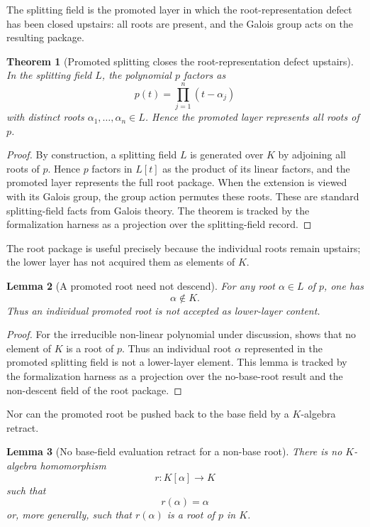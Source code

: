 \documentclass[11pt]{article}
\newtheorem{theorem}{Theorem}[section]
\newtheorem{lemma}[theorem]{Lemma}
\theoremstyle{definition}
\begin{document}
The splitting field is the promoted layer in which the root-representation defect
has been closed upstairs: all roots are present, and the Galois group acts on the
resulting package.

\begin{theorem}[Promoted splitting closes the root-representation defect upstairs]
\label{thm:gal-splitting-closes-upstairs}
In the splitting field \(L\), the polynomial \(p\) factors as
\[
p(t)=\prod_{j=1}^{n}(t-\alpha_j)
\]
with distinct roots \(\alpha_1,\ldots,\alpha_n\in L\).  Hence the promoted layer represents all roots of \(p\).
\end{theorem}

\begin{proof}
By construction, a splitting field \(L\) is generated over \(K\) by adjoining all
roots of \(p\).  Hence \(p\) factors in \(L[t]\) as the product of its linear
factors, and the promoted layer represents the full root package.  When the
extension is viewed with its Galois group, the group action permutes these roots.
These are standard splitting-field facts from Galois theory.  The theorem is
tracked by the formalization harness as a projection over the splitting-field
record.
\end{proof}

The root package is useful precisely because the individual roots remain
upstairs; the lower layer has not acquired them as elements of \(K\).

\begin{lemma}[A promoted root need not descend]
\label{lem:gal-root-not-descend}
For any root \(\alpha\in L\) of \(p\), one has
\[
\alpha\notin K.
\]
Thus an individual promoted root is not accepted as lower-layer content.
\end{lemma}

\begin{proof}
For the irreducible non-linear polynomial under discussion, 
shows that no element of \(K\) is a root of \(p\).  Thus an individual root
\(\alpha\) represented in the promoted splitting field is not a lower-layer
element.  This lemma is tracked by the formalization harness as a projection over
the no-base-root result and the non-descent field of the root package.
\end{proof}

Nor can the promoted root be pushed back to the base field by a \(K\)-algebra
retract.

\begin{lemma}[No base-field evaluation retract for a non-base root]
\label{lem:gal-no-root-retract}
There is no \(K\)-algebra homomorphism
\[
r:K[\alpha]\to K
\]
such that
\[
r(\alpha)=\alpha
\]
or, more generally, such that \(r(\alpha)\) is a root of \(p\) in \(K\).
\end{lemma}
\end{document}
